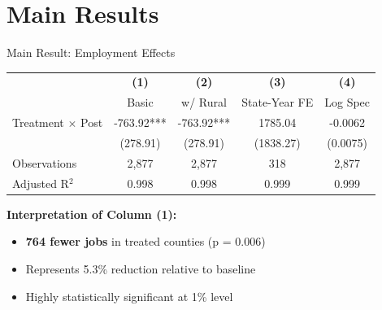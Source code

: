 \documentclass[aspectratio=169]{beamer}
\begin{document}
\section{Main Results}

\begin{frame}{Main Result: Employment Effects}
\begin{table}
\footnotesize
\begin{tabular}{lcccc}
\toprule
 & \textbf{(1)} & \textbf{(2)} & \textbf{(3)} & \textbf{(4)} \\
 & Basic & w/ Rural & State-Year FE & Log Spec \\
\midrule
Treatment $\times$ Post & -763.92*** & -763.92*** & 1785.04 & -0.0062 \\
 & (278.91) & (278.91) & (1838.27) & (0.0075) \\
\addlinespace
Observations & 2,877 & 2,877 & 318 & 2,877 \\
Adjusted R$^2$ & 0.998 & 0.998 & 0.999 & 0.999 \\
\bottomrule
\end{tabular}
\end{table}

\vspace{0.3cm}

\textbf{Interpretation of Column (1):}
\begin{itemize}
    \item \textbf{764 fewer jobs} in treated counties (p = 0.006)
    \item Represents 5.3\% reduction relative to baseline
    \item Highly statistically significant at 1\% level
\end{itemize}
\end{frame}
\end{document}
